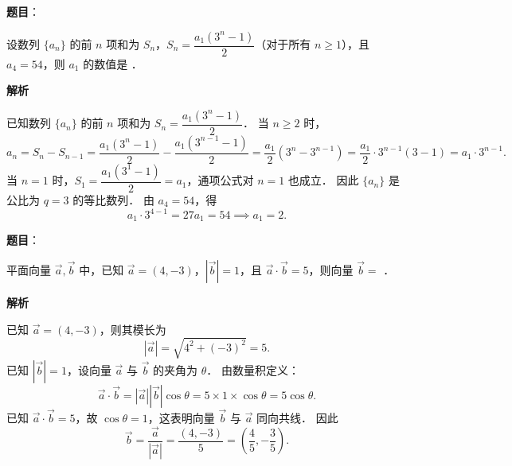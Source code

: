 \begin{answer}

\textbf{题目}：

设数列 $\{a_n\}$ 的前 $n$ 项和为 $S_n$，$S_n = \dfrac{a_1(3^n - 1)}{2}$（对于所有 $n \geqslant 1$），且 $a_4 = 54$，则 $a_1$ 的数值是 \underline{\hspace{3cm}}．

\textbf{解析}

已知数列 $\{a_n\}$ 的前 $n$ 项和为 $S_n = \dfrac{a_1(3^n - 1)}{2}$．
当 $n \geqslant 2$ 时，
\nopagebreak[4]
\[
a_n = S_n - S_{n-1} = \frac{a_1(3^n - 1)}{2} - \frac{a_1(3^{n-1} - 1)}{2} = \frac{a_1}{2} \left(3^n - 3^{n-1}\right) = \frac{a_1}{2} \cdot 3^{n-1}(3 - 1) = a_1 \cdot 3^{n-1}.
\]
当 $n = 1$ 时，$S_1 = \dfrac{a_1(3^1 - 1)}{2} = a_1$，通项公式对 $n = 1$ 也成立．
因此 $\{a_n\}$ 是公比为 $q = 3$ 的等比数列．
由 $a_4 = 54$，得
\nopagebreak[4]
\[
a_1 \cdot 3^{4-1} = 27 a_1 = 54 \implies a_1 = 2.
\]


\end{answer}
\begin{answer}

\textbf{题目}：

平面向量 $\vec{a}, \vec{b}$ 中，已知 $\vec{a} = (4, -3)$，$|\vec{b}| = 1$，且 $\vec{a} \cdot \vec{b} = 5$，则向量 $\vec{b} =$ \underline{\hspace{3cm}}．

\textbf{解析}

已知 $\vec{a} = (4, -3)$，则其模长为
\nopagebreak[4]
\[
|\vec{a}| = \sqrt{4^2 + (-3)^2} = 5.
\]
已知 $|\vec{b}| = 1$，设向量 $\vec{a}$ 与 $\vec{b}$ 的夹角为 $\theta$．
由数量积定义：
\nopagebreak[4]
\[
\vec{a} \cdot \vec{b} = |\vec{a}| |\vec{b}| \cos\theta = 5 \times 1 \times \cos\theta = 5\cos\theta.
\]
已知 $\vec{a} \cdot \vec{b} = 5$，故 $\cos\theta = 1$，这表明向量 $\vec{b}$ 与 $\vec{a}$ 同向共线．
因此
\nopagebreak[4]
\[
\vec{b} = \frac{\vec{a}}{|\vec{a}|} = \frac{(4, -3)}{5} = \left(\frac{4}{5}, -\frac{3}{5}\right).
\]


\end{answer}
